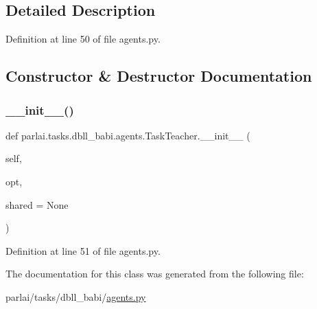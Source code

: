 \subsection{Detailed Description}


Definition at line 50 of file agents.\+py.



\subsection{Constructor \& Destructor Documentation}
\mbox{\label{classparlai_1_1tasks_1_1dbll__babi_1_1agents_1_1TaskTeacher_a8e42d5b61c8f9eebccd45c467506077d}} 
\subsubsection{\texorpdfstring{\+\_\+\+\_\+init\+\_\+\+\_\+()}{\_\_init\_\_()}}
{\footnotesize\ttfamily def parlai.\+tasks.\+dbll\+\_\+babi.\+agents.\+Task\+Teacher.\+\_\+\+\_\+init\+\_\+\+\_\+ (\begin{DoxyParamCaption}\item[{}]{self,  }\item[{}]{opt,  }\item[{}]{shared = {\ttfamily None} }\end{DoxyParamCaption})}



Definition at line 51 of file agents.\+py.



The documentation for this class was generated from the following file\+:\begin{DoxyCompactItemize}
\item 
parlai/tasks/dbll\+\_\+babi/\hyperlink{parlai_2tasks_2dbll__babi_2agents_8py}{agents.\+py}\end{DoxyCompactItemize}
